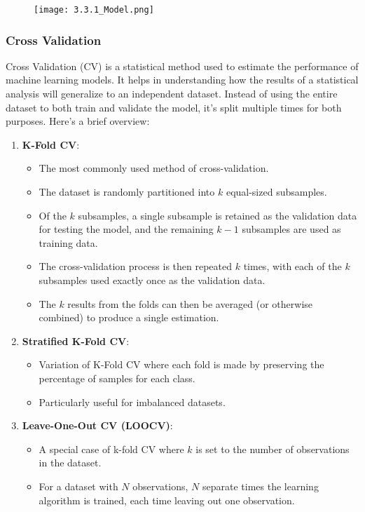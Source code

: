 \documentclass{article}
\begin{document}
\begin{figure}[h]
\centering
\texttt{[image: 3.3.1\_Model.png]}
\end{figure}

\subsubsection{Cross Validation}
Cross Validation (CV) is a statistical method used to estimate the performance of machine learning models. It helps in understanding how the results of a statistical analysis will generalize to an independent dataset. Instead of using the entire dataset to both train and validate the model, it's split multiple times for both purposes. Here's a brief overview:

\begin{enumerate}
    \item \textbf{K-Fold CV}:
    \begin{itemize}
        \item The most commonly used method of cross-validation.
        \item The dataset is randomly partitioned into \( k \) equal-sized subsamples.
        \item Of the \( k \) subsamples, a single subsample is retained as the validation data for testing the model, and the remaining \( k-1 \) subsamples are used as training data.
        \item The cross-validation process is then repeated \( k \) times, with each of the \( k \) subsamples used exactly once as the validation data.
        \item The \( k \) results from the folds can then be averaged (or otherwise combined) to produce a single estimation.
    \end{itemize}

    \item \textbf{Stratified K-Fold CV}:
    \begin{itemize}
        \item Variation of K-Fold CV where each fold is made by preserving the percentage of samples for each class.
        \item Particularly useful for imbalanced datasets.
    \end{itemize}

    \item \textbf{Leave-One-Out CV (LOOCV)}:
    \begin{itemize}
        \item A special case of k-fold CV where \( k \) is set to the number of observations in the dataset.
        \item For a dataset with \( N \) observations, \( N \) separate times the learning algorithm is trained, each time leaving out one observation.
    \end{itemize}


\end{enumerate}
\end{document}
